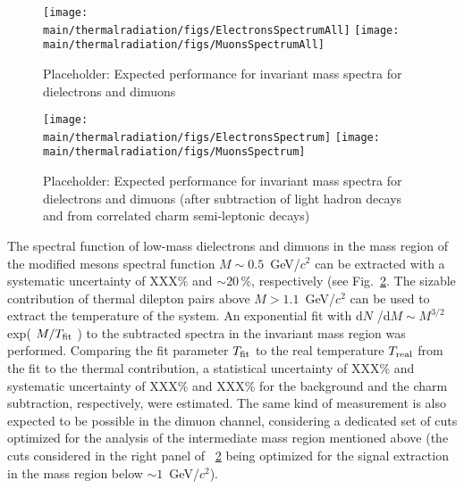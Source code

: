 \documentclass[../report.tex]{subfiles}
\providecommand{\main}{..}
\begin{document}
\begin{figure}[htb]
\centering
\texttt{[image: \\main/thermalradiation/figs/ElectronsSpectrumAll]}
\texttt{[image: \\main/thermalradiation/figs/MuonsSpectrumAll]}
\caption{Placeholder: Expected performance for invariant mass spectra for dielectrons and dimuons}
\label{fig:DileptonsSpectra}
\end{figure}

\begin{figure}[htb]
\centering
\texttt{[image: \\main/thermalradiation/figs/ElectronsSpectrum]}
\texttt{[image: \\main/thermalradiation/figs/MuonsSpectrum]}
\caption{Placeholder: Expected performance for invariant mass spectra for dielectrons and dimuons (after subtraction of light hadron decays and from correlated charm semi-leptonic decays)}
\label{fig:DileptonsSpectraSubtracted}
\end{figure}

The spectral function of low-mass dielectrons and dimuons in the mass region of the modified \Prho mesons spectral function $M\sim0.5$~GeV/$c^2$ can be extracted with a systematic uncertainty of XXX\% and $\sim 20$\,\%, respectively (see Fig.~\ref{fig:DileptonsSpectraSubtracted}. 
The sizable contribution of thermal dilepton pairs above $M>1.1$~GeV/$c^2$ can be used to extract the temperature of the system. An exponential fit with d$N$ /d$M \sim  M^{3/2}$ exp( $M /T_{\rm fit}$ ) to the subtracted \Pepem spectra in the invariant mass region  was performed. Comparing the fit parameter $T_{\rm fit}$ to the real temperature $T_{\rm real}$ from the fit to the thermal contribution, a statistical uncertainty of XXX\% and systematic uncertainty of XXX\% and XXX\% for the background and the charm subtraction, respectively, were estimated. The same kind of measurement is also expected to be possible in the dimuon channel, considering a dedicated set of cuts optimized for the analysis of the intermediate mass region mentioned above (the cuts considered in the right panel of \figurename~\ref{fig:DileptonsSpectraSubtracted} being optimized for the signal extraction in the mass region below $\sim 1$~GeV/$c^2$).
\end{document}
